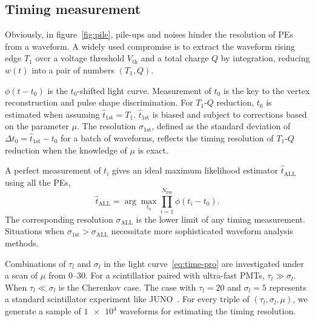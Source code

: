 \subsection{Timing measurement}
Obviously, in figure~\ref{fig:pile}, pile-ups and noises hinder the resolution of PEs from a waveform. A widely used compromise is to extract the waveform rising edge $T_1$ over a voltage threshold $V_\mathrm{th}$ and a total charge $Q$ by integration, reducing $w(t)$ into a pair of numbers $(T_1, Q)$.

$\phi(t-t_0)$ is the $t_0$-shifted light curve. Measurement of $t_0$ is the key to the vertex reconstruction and pulse shape discrimination. For $T_1$-$Q$ reduction, $t_0$ is estimated when assuming $\hat{t}_\mathrm{1st} = T_1$. $\hat{t}_\mathrm{1st}$ is biased and subject to corrections based on the parameter $\mu$. The resolution $\sigma_\mathrm{1st}$, defined as the standard deviation of $\Delta t_0 = \hat{t}_\mathrm{1st} - t_0$ for a 
batch of waveforms, reflects the timing resolution of $T_1$-$Q$ reduction when the knowledge of $\mu$ is exact.

A perfect measurement of $t_i$ gives an ideal maximum likelihood estimator $\hat{t}_\mathrm{ALL}$ using all the PEs,
\begin{equation}
  \label{eq:2}
  \hat{t}_\mathrm{ALL} = \arg\underset{t_0}{\max} \prod_{i=1}^{N_\mathrm{PE}} \phi(t_i-t_0).
\end{equation}
The corresponding resolution $\sigma_\mathrm{ALL}$ is the lower limit of any timing measurement. Situations when $\sigma_\mathrm{1st} > \sigma_\mathrm{ALL}$ necessitate more sophisticated waveform analysis methods.

Combinations of $\tau_l$ and $\sigma_l$ in the light curve~\eqref{eq:time-pro} are investigated under a scan of $\mu$ from \numrange{0}{30}. For a scintillatior paired with ultra-fast PMTs, $\tau_l \gg \sigma_l$. When $\tau_l \ll \sigma_l$ is the Cherenkov case. The case with $\tau_l=20$ and $\sigma_l=5$ represents a standard scintillator experiment like JUNO~\cite{rebber_particle_2021}. For every triple of $(\tau_l, \sigma_l, \mu)$, we generate a sample of $\num[retain-unity-mantissa=false]{1e4}$ waveforms for estimating the timing resolution. 

